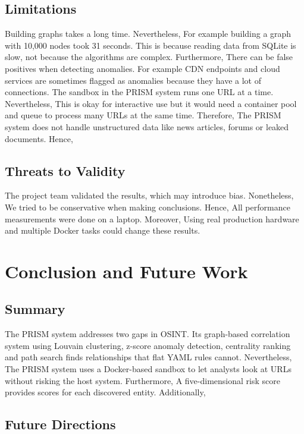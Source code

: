 \documentclass[conference]{IEEEtran}
\begin{document}
\subsection{Limitations}

Building graphs takes a long time. Nevertheless, For example building a graph with 10,000 nodes took 31 seconds. This is because reading data from SQLite is slow, not because the algorithms are complex. Furthermore, There can be false positives when detecting anomalies. For example CDN endpoints and cloud services are sometimes flagged as anomalies because they have a lot of connections. The sandbox in the PRISM system runs one URL at a time. Nevertheless, This is okay for interactive use but it would need a container pool and queue to process many URLs at the same time. Therefore, The PRISM system does not handle unstructured data like news articles, forums or leaked documents. Hence,

\subsection{Threats to Validity}

The project team validated the results, which may introduce bias. Nonetheless, We tried to be conservative when making conclusions. Hence, All performance measurements were done on a laptop. Moreover, Using real production hardware and multiple Docker tasks could change these results.

\section{Conclusion and Future Work}
\label{sec:conclusion}

\subsection{Summary}

The PRISM system addresses two gaps in OSINT. Its graph-based correlation system using Louvain clustering, z-score anomaly detection, centrality ranking and path search finds relationships that flat YAML rules cannot. Nevertheless, The PRISM system uses a Docker-based sandbox to let analysts look at URLs without risking the host system. Furthermore, A five-dimensional risk score provides scores for each discovered entity. Additionally,

\subsection{Future Directions}
\end{document}
